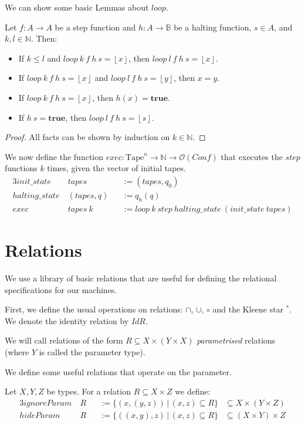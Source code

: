 \documentclass{psartcl}
\newcommand{\setOf}[1]{\bigl \{ #1 \bigr \}}
\newcommand{\setMap}[2]{\setOf{#1 \,\big|\, #2}}
\newcommand{\from}{:}
\renewcommand{\to}{\rightarrow}
\newcommand{\Opt}{\mathcal{O}}
\newcommand{\Bool}{\mathbb{B}}
\newcommand{\Nat}{\mathbb{N}}
\newcommand{\Some}[1]{\left\lfloor #1\right\rfloor}
\newcommand{\true}{\mathbf{true}}
\newcommand{\Tape}{\txt{Tape}}
\newcommand{\Tapes}[1]{\Tape^{#1}}
\newcommand{\IdR}{\mathit{IdR}}
\newcommand{\txt}[1]{\text{#1}}
\begin{document}
We can show some basic Lemmas about $loop$.
\begin{fact}
  \label{fact:loop}
  Let $f \from A \to A$ be a step function and $h \from A \to \Bool$ be a halting function, $s \in A$, and $k, l \in \Nat$.  Then:
  \begin{itemize}
    \item If $k \le l$ and $loop~k~f~h~s = \Some x$, then $loop~l~f~h~s = \Some x$.
    \item If $loop~k~f~h~s = \Some x$ and $loop~l~f~h~s = \Some y$, then $x = y$.
    \item If $loop~k~f~h~s = \Some{x}$, then $h(x) = \true$.
    \item If $h~s = \true$, then $loop~l~f~h~s = \Some{s}$.
  \end{itemize}
\end{fact}
\begin{proof}
  All facts can be shown by induction on $k \in \Nat$.
\end{proof}

We now define the function $exec \from \Tapes{n} \to \Nat \to \Opt(Conf)$ that executes the $step$ functions $k$ times, given the vector of initial
tapes.
\begin{alignat*}{3}
  init\_state   &~tapes      &&:= (tapes, q_0) \\
  halting\_state&~(tapes, q) &&:= q_h(q) \\
  exec          &~tapes~k    &&:= loop~k~step~halting\_state~(init\_state~tapes)
\end{alignat*}


\section{Relations}

We use a library of basic relations that are useful for defining the relational specifications for our machines.

First, we define the usual operations on relations: $\cap$, $\cup$, $\circ$ and the Kleene star $^*$.
We denote the identity relation by $\IdR$.

We will call relations of the form $R \subseteq X \times (Y \times X)$ \emph{parametrised} relations (where $Y$ is called the parameter type).

We define some useful relations that operate on the parameter.

\begin{definition}
  \label{def:rel-param-op}
  Let $X, Y, Z$ be types.  For a relation $R \subseteq X \times Z$ we define:
  \begin{alignat*}{3}
    ignoreParam&~R &&:= \setMap{(x, (y, z))}{(x, z) \subseteq R} & \subseteq X \times (Y \times Z) \\
    hideParam  &~R &&:= \setMap{((x, y), z)}{(x, z) \subseteq R} & \subseteq (X \times Y) \times Z
  \end{alignat*}
\end{definition}
\end{document}
